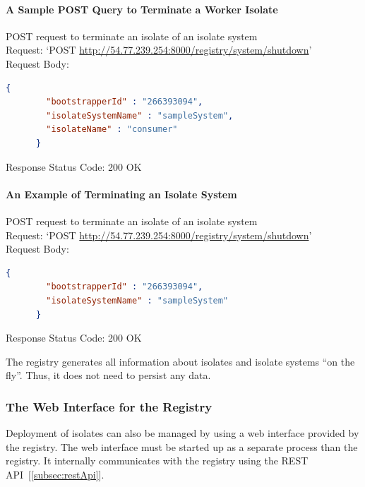 \paragraph{A Sample POST Query to Terminate a Worker Isolate}
  \begin{description}
    \item{POST request to terminate an isolate of an isolate system}\\
    Request: ‘POST \url{http://54.77.239.254:8000/registry/system/shutdown}’\\
    Request Body:
    \begin{lstlisting}[language=json,firstnumber=1]
      {
        "bootstrapperId" : "266393094",
        "isolateSystemName" : "sampleSystem",
        "isolateName" : "consumer"
      }
    \end{lstlisting}
    Response Status Code: 200 OK
  \end{description}

\paragraph{An Example of Terminating an Isolate System}
  \begin{description}
    \item{POST request to terminate an isolate of an isolate system}\\
    Request: ‘POST \url{http://54.77.239.254:8000/registry/system/shutdown}’\\
    Request Body:
    \begin{lstlisting}[language=json,firstnumber=1]
      {
        "bootstrapperId" : "266393094",
        "isolateSystemName" : "sampleSystem"
      }
    \end{lstlisting}
    Response Status Code: 200 OK
  \end{description}

The registry generates all information about isolates and isolate systems “on the fly”. Thus, it does not need to persist any data.

  \subsubsection{The Web Interface for the Registry}
  \label{subsubsection:registryWebInterface}
  Deployment of isolates can also be managed by using a web interface provided by the registry. The web interface must be started up as a separate process than the registry. It internally communicates with the registry using the REST API~[\ref{subsec:restApi}].


